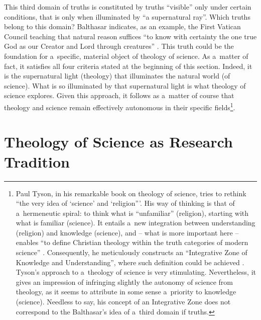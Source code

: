 This third domain of truths is constituted by truths ``visible'' only under certain conditions, that is only when illuminated by ``a supernatural ray''. Which truths belong to this domain? Balthasar indicates, as an example, the First Vatican Council teaching that natural reason suffices ``to know with certainty the one true God as our Creator and Lord through creatures'' 
\parencite[][p.12]{balthasar_theo-logic_2000}. %
 This truth could be the foundation for a~specific, material object of theology of science. As a~matter of fact, it satisfies all four criteria stated at the beginning of this section. Indeed, it is the supernatural light (theology) that illuminates the natural world (of science). What is so illuminated by that supernatural light is what theology of science explores. Given this approach, it follows as a~matter of course that theology and science remain effectively autonomous in their specific fields\footnote{Paul Tyson, in his remarkable book on theology of science, tries to rethink ``the very idea of ‘science' and ‘religion'''. His way of thinking is that of a~hermeneutic spiral: to think what is ``unfamiliar'' (religion), starting with what is familiar (science). It entails a~new integration between understanding (religion) and knowledge (science), and -- what is more important here -- enables ``to define Christian theology within the truth categories of modern science'' 
\parencite[][p.9]{tyson_christian_2022}. %
 Consequently, he meticulously constructs an ``Integrative Zone of Knowledge and Understanding'', where such definition could be achieved 
\parencite[][chap.9]{tyson_christian_2022}. %
 Tyson's approach to a~theology of science is very stimulating. Nevertheless, it gives an impression of infringing slightly the autonomy of science from theology, as it seems to attribute in some sense a~priority to knowledge (science). Needless to say, his concept of an Integrative Zone does not correspond to the Balthasar's idea of a~third domain if truths. }.



\section{Theology of Science as Research Tradition}


